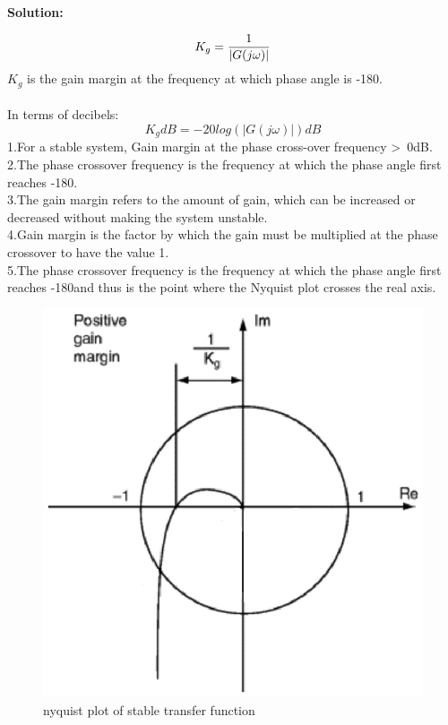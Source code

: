 \begin{enumerate}[label=\thesection.\arabic*.,ref=\thesection.\theenumi]
\textbf{ Solution:}

\begin{equation}
   \\ K_g = \frac{1}{|G(j\omega)|}
\end{equation} 
$K_g$ is the gain margin
at the frequency at which phase angle
is -180\degree.
\\\\ 
In terms of decibels: 
\begin{equation}
    K_g dB = -20log(|G(j\omega)|) dB
\end{equation}
1.For a stable system, Gain margin at the phase cross-over frequency \textgreater \ 0dB. \\
2.The phase crossover frequency is the frequency at which the phase angle first reaches -180\degree. \\
3.The gain margin refers to the amount of gain, which can be increased or decreased without making the system unstable. \\
4.Gain margin is the factor by which the gain must be multiplied at the phase crossover to have the value 1. \\
5.The phase crossover frequency is the frequency at which the phase angle first reaches -180\degree and thus is the point where the Nyquist plot crosses the real axis. \\
\begin{figure}[h]
    \centering
    \includegraphics[scale = 1]{./figs/1.eps}
    \caption{nyquist plot of stable transfer function}
\end{figure}


\end{enumerate}
